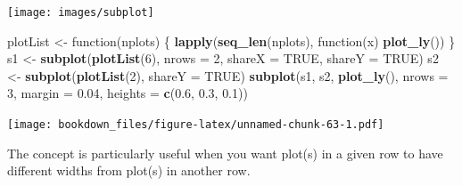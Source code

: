\documentclass[12pt,]{isuthesis}
\newenvironment{Shaded}{\begin{snugshade}}{\end{snugshade}}
\newcommand{\KeywordTok}[1]{\textcolor[rgb]{0.13,0.29,0.53}{\textbf{{#1}}}}
\newcommand{\DataTypeTok}[1]{\textcolor[rgb]{0.13,0.29,0.53}{{#1}}}
\newcommand{\DecValTok}[1]{\textcolor[rgb]{0.00,0.00,0.81}{{#1}}}
\newcommand{\FloatTok}[1]{\textcolor[rgb]{0.00,0.00,0.81}{{#1}}}
\newcommand{\StringTok}[1]{\textcolor[rgb]{0.31,0.60,0.02}{{#1}}}
\newcommand{\OtherTok}[1]{\textcolor[rgb]{0.56,0.35,0.01}{{#1}}}
\newcommand{\NormalTok}[1]{{#1}}
\begin{document}
\texttt{[image: images/subplot]}

\begin{Shaded}
\begin{Highlighting}[]
\NormalTok{plotList <-}\StringTok{ }\NormalTok{function(nplots) \{}
  \KeywordTok{lapply}\NormalTok{(}\KeywordTok{seq_len}\NormalTok{(nplots), function(x) }\KeywordTok{plot_ly}\NormalTok{())}
\NormalTok{\}}
\NormalTok{s1 <-}\StringTok{ }\KeywordTok{subplot}\NormalTok{(}\KeywordTok{plotList}\NormalTok{(}\DecValTok{6}\NormalTok{), }\DataTypeTok{nrows =} \DecValTok{2}\NormalTok{, }\DataTypeTok{shareX =} \OtherTok{TRUE}\NormalTok{, }\DataTypeTok{shareY =} \OtherTok{TRUE}\NormalTok{)}
\NormalTok{s2 <-}\StringTok{ }\KeywordTok{subplot}\NormalTok{(}\KeywordTok{plotList}\NormalTok{(}\DecValTok{2}\NormalTok{), }\DataTypeTok{shareY =} \OtherTok{TRUE}\NormalTok{)}
\KeywordTok{subplot}\NormalTok{(s1, s2, }\KeywordTok{plot_ly}\NormalTok{(), }\DataTypeTok{nrows =} \DecValTok{3}\NormalTok{, }\DataTypeTok{margin =} \FloatTok{0.04}\NormalTok{, }\DataTypeTok{heights =} \KeywordTok{c}\NormalTok{(}\FloatTok{0.6}\NormalTok{, }\FloatTok{0.3}\NormalTok{, }\FloatTok{0.1}\NormalTok{))}
\end{Highlighting}
\end{Shaded}

\texttt{[image: bookdown\_files/figure-latex/unnamed-chunk-63-1.pdf]}

The concept is particularly useful when you want plot(s) in a given row
to have different widths from plot(s) in another row.
\end{document}

